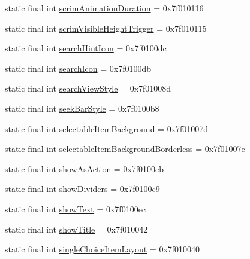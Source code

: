 \begin{CompactItemize}
\item 
static final int \hyperlink{classandroid_1_1support_1_1v7_1_1cardview_1_1_r_1_1attr_35c23ea8f78075ae353978e0c8e67a6a}{scrimAnimationDuration} = 0x7f010116
\item 
static final int \hyperlink{classandroid_1_1support_1_1v7_1_1cardview_1_1_r_1_1attr_fc0e6f2fa0b32e9a8d0e73ec2204fb68}{scrimVisibleHeightTrigger} = 0x7f010115
\item 
static final int \hyperlink{classandroid_1_1support_1_1v7_1_1cardview_1_1_r_1_1attr_0b3389e24a8a82afc3b9b8e8bd2d34ec}{searchHintIcon} = 0x7f0100dc
\item 
static final int \hyperlink{classandroid_1_1support_1_1v7_1_1cardview_1_1_r_1_1attr_47937f253d4d20520b3cfa867694dd67}{searchIcon} = 0x7f0100db
\item 
static final int \hyperlink{classandroid_1_1support_1_1v7_1_1cardview_1_1_r_1_1attr_3bf1a5a39c7271a27becd94b9dfe4656}{searchViewStyle} = 0x7f01008d
\item 
static final int \hyperlink{classandroid_1_1support_1_1v7_1_1cardview_1_1_r_1_1attr_056343741e780cf8a84beeb52da6239d}{seekBarStyle} = 0x7f0100b8
\item 
static final int \hyperlink{classandroid_1_1support_1_1v7_1_1cardview_1_1_r_1_1attr_942d899c628a2c3a0d3036b582318c1d}{selectableItemBackground} = 0x7f01007d
\item 
static final int \hyperlink{classandroid_1_1support_1_1v7_1_1cardview_1_1_r_1_1attr_7ec98ca619f96811b7a4646533046c64}{selectableItemBackgroundBorderless} = 0x7f01007e
\item 
static final int \hyperlink{classandroid_1_1support_1_1v7_1_1cardview_1_1_r_1_1attr_3d449aa5efe2fdad10093c428a0d0715}{showAsAction} = 0x7f0100cb
\item 
static final int \hyperlink{classandroid_1_1support_1_1v7_1_1cardview_1_1_r_1_1attr_67850cb428017778b7f9bb9d48ab1628}{showDividers} = 0x7f0100c9
\item 
static final int \hyperlink{classandroid_1_1support_1_1v7_1_1cardview_1_1_r_1_1attr_69b74108620f749421e759539073e05f}{showText} = 0x7f0100ec
\item 
static final int \hyperlink{classandroid_1_1support_1_1v7_1_1cardview_1_1_r_1_1attr_f4746adb3ea1ce0706257304887816cf}{showTitle} = 0x7f010042
\item 
static final int \hyperlink{classandroid_1_1support_1_1v7_1_1cardview_1_1_r_1_1attr_b1346019f1dd737c40ca5cca68e949af}{singleChoiceItemLayout} = 0x7f010040
\item 

\end{CompactItemize}
